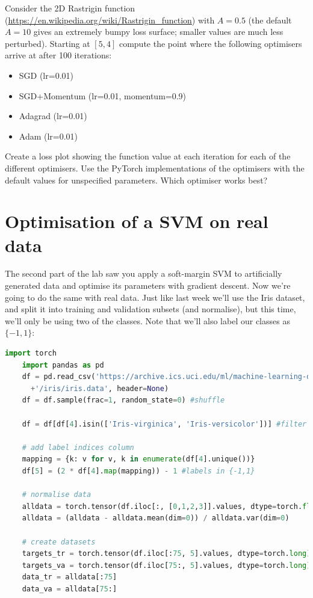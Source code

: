 \documentclass[a4paper]{article}
\begin{document}
\begin{tcolorbox}[title=1.1 Rastrigin (3 marks)]
Consider the 2D Rastrigin function (\url{https://en.wikipedia.org/wiki/Rastrigin_function}) with $A=0.5$ (the default $A=10$ gives an extremely bumpy loss surface; smaller values are much less perturbed). Starting at $[5, 4]$ compute the point where the following optimisers arrive at after 100 iterations:

\begin{itemize}
	\item SGD (lr=0.01)
	\item SGD+Momentum (lr=0.01, momentum=0.9)
	\item Adagrad (lr=0.01)
	\item Adam (lr=0.01)
\end{itemize}

Create a loss plot showing the function value at each iteration for each of the different optimisers. Use the PyTorch implementations of the optimisers with the default values for unspecified parameters. Which optimiser works best?
\end{tcolorbox}

\section{Optimisation of a SVM on real data}\label{SVM}
The second part of the lab saw you apply a soft-margin SVM to artificially generated data and optimise its parameters with gradient descent. Now we're going to do the same with real data. Just like last week we'll use the Iris dataset, and split it into training and validation subsets (and normalise), but this time, we'll only be using two of the classes. Note that we'll also label our classes as $\{-1,1\}$:

\begin{lstlisting}[language=Python]
	import torch
	import pandas as pd
	df = pd.read_csv('https://archive.ics.uci.edu/ml/machine-learning-databases'
	  +'/iris/iris.data', header=None)
	df = df.sample(frac=1, random_state=0) #shuffle

	df = df[df[4].isin(['Iris-virginica', 'Iris-versicolor'])] #filter

	# add label indices column
	mapping = {k: v for v, k in enumerate(df[4].unique())}  
	df[5] = (2 * df[4].map(mapping)) - 1 #labels in {-1,1}

	# normalise data
	alldata = torch.tensor(df.iloc[:, [0,1,2,3]].values, dtype=torch.float)
	alldata = (alldata - alldata.mean(dim=0)) / alldata.var(dim=0)

	# create datasets
	targets_tr = torch.tensor(df.iloc[:75, 5].values, dtype=torch.long)
	targets_va = torch.tensor(df.iloc[75:, 5].values, dtype=torch.long)
	data_tr = alldata[:75]
	data_va = alldata[75:]
\end{lstlisting}
\end{document}
